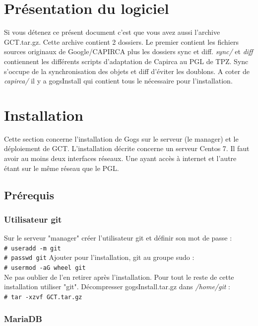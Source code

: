 \documentclass{article}
\newcommand{\shellcmd}[1]{\\\indent\indent\texttt{\footnotesize\# #1}\\}
\newcommand{\shellcmdd}[1]{\\\indent\indent\texttt{\footnotesize\# #1}}
\begin{document}
  \section{Présentation du logiciel}

  \noindent Si vous détenez ce présent document c'est que vous avez aussi l'archive GCT.tar.gz. Cette archive contient 2 dossiers.
  Le premier contient les fichiers sources originaux de Google/CAPIRCA plus les dossiers sync et diff. \textit{sync/} et
  \textit{diff} contiennent les différents scripts d'adaptation de Capirca au PGL de TPZ. Sync s'occupe de la synchronisation
  des objets et diff d'éviter les doublons.
  A coter de \textit{capirca/} il y a gogsInstall qui contient tous le nécessaire pour l'installation.

  \section{Installation}

    \noindent Cette section concerne l'installation de Gogs sur le serveur (le manager) et le déploiement de GCT.
    L'installation décrite concerne un serveur Centos 7. Il faut avoir au moins deux interfaces réseaux.
    Une ayant accès à internet et l'autre étant sur le même réseau que le PGL.

    \subsection{Prérequis}

      \subsubsection{Utilisateur git}

      \noindent Sur le serveur "manager" créer l'utilisateur git et définir son mot de passe : \shellcmdd{useradd -m git}
      \shellcmdd{passwd git}\smallbreak
      \noindent Ajouter pour l'installation, git au groupe sudo : \shellcmd{usermod -aG wheel git}
      Ne pas oublier de l'en retirer après l'installation.
      Pour tout le reste de cette installation utiliser "git". \smallbreak
      \noindent Décompresser gogsInstall.tar.gz dans \textit{/home/git} : \shellcmd{tar -xzvf GCT.tar.gz}

      \subsubsection{MariaDB}
\end{document}
